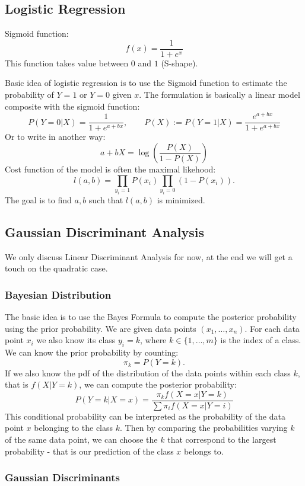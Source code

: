\documentclass[12pt]{amsart}
\numberwithin{equation}{section}
\theoremstyle{plain}
\theoremstyle{definition}
\begin{document}
\subsection{Logistic Regression}

Sigmoid function: $$f(x)=\frac{1}{1+e^x}$$ This function takes value between $0$ and $1$ (S-shape).

Basic idea of logistic regression is to use the Sigmoid function to estimate the probability of $Y=1$ or $Y=0$ given $x$. The formulation is basically a linear model composite with the sigmoid function:
$$
P(Y=0|X)=\frac{1}{1+e^{a+bx}},\qquad P(X):=P(Y=1|X)=\frac{e^{a+bx}}{1+e^{a+bx}}
$$
Or to write in another way:
$$
a+bX = \log(\frac{P(X)}{1-P(X)})
$$
Cost function of the model is often the maximal likehood:
$$
l(a,b)=\prod_{y_i=1}P(x_i)\prod_{y_i=0}(1-P(x_i)).
$$
The goal is to find $a, b$ such that $l(a,b)$ is minimized.

\subsection{Gaussian Discriminant Analysis}

We only discuss Linear Discriminant Analysis for now, at the end we will get a touch on the quadratic case.

\subsubsection{Bayesian Distribution}
The basic idea is to use the Bayes Formula to compute the posterior probability using the prior probability. We are given data points $(x_1,\ldots, x_n)$. For each data point $x_i$ we also know its class $y_i = k$, where $k \in \{1,\ldots, m\}$ is the index of a class. We can know the prior probability by counting:
$$
\pi_k = P(Y = k).
$$
If we also know the pdf of the distribution of the data points within each class $k$, that is $f(X|Y=k)$, we can compute the posterior probability:
$$
P(Y=k|X=x) = \frac{\pi_kf(X=x|Y=k)}{\sum \pi_if(X=x|Y=i)}
$$
This conditional probability can be interpreted as the probability of the data point $x$ belonging to the class $k$. Then by comparing the probabilities varying $k$ of the same data point, we can choose the $k$ that correspond to the largest probability - that is our prediction of the class $x$ belongs to.

\subsubsection{Gaussian Discriminants}
\end{document}
